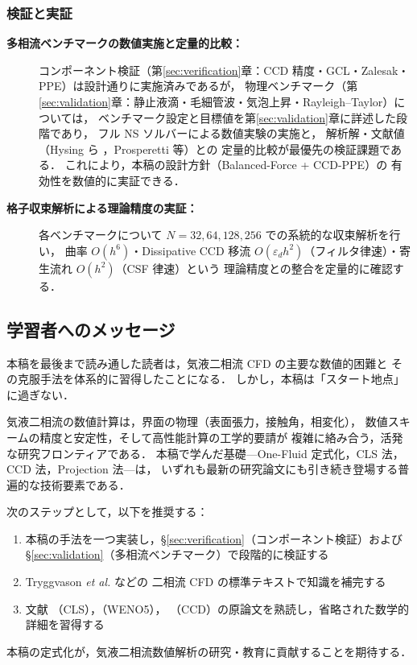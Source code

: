 \subsubsection{検証と実証}

\begin{description}
  \item[\textbf{多相流ベンチマークの数値実施と定量的比較：}]
        コンポーネント検証（第\ref{sec:verification}章：CCD 精度・GCL・Zalesak・PPE）は設計通りに実施済みであるが，
        物理ベンチマーク（第\ref{sec:validation}章：静止液滴・毛細管波・気泡上昇・Rayleigh--Taylor）については，
        ベンチマーク設定と目標値を第\ref{sec:validation}章に詳述した段階であり，
        フル NS ソルバーによる数値実験の実施と，
        解析解・文献値（Hysing ら \cite{Hysing2009}，Prosperetti \cite{Prosperetti1981} 等）との
        定量的比較が最優先の検証課題である．
        これにより，本稿の設計方針（Balanced-Force + CCD-PPE）の
        有効性を数値的に実証できる．

  \item[\textbf{格子収束解析による理論精度の実証：}]
        各ベンチマークについて $N = 32, 64, 128, 256$ での系統的な収束解析を行い，
        曲率 $O(h^6)$・Dissipative CCD 移流 $O(\varepsilon_d h^2)$（フィルタ律速）・寄生流れ $O(h^2)$（CSF 律速）という
        理論精度との整合を定量的に確認する．
\end{description}

\subsection{学習者へのメッセージ}
\label{sec:message}

本稿を最後まで読み通した読者は，気液二相流 CFD の主要な数値的困難と
その克服手法を体系的に習得したことになる．
しかし，本稿は「スタート地点」に過ぎない．

気液二相流の数値計算は，界面の物理（表面張力，接触角，相変化），
数値スキームの精度と安定性，そして高性能計算の工学的要請が
複雑に絡み合う，活発な研究フロンティアである．
本稿で学んだ基礎—One-Fluid 定式化，CLS 法，CCD 法，Projection 法—は，
いずれも最新の研究論文にも引き続き登場する普遍的な技術要素である．

次のステップとして，以下を推奨する：
\begin{enumerate}
  \item 本稿の手法を一つ実装し，§\ref{sec:verification}（コンポーネント検証）および §\ref{sec:validation}（多相流ベンチマーク）で段階的に検証する
  \item Tryggvason \textit{et al.} \cite{Tryggvason2011} などの
        二相流 CFD の標準テキストで知識を補完する
  \item 文献 \cite{OlssonKreiss2005}（CLS），\cite{JiangShu1996}（WENO5），
        \cite{ChuFan1998}（CCD）の原論文を熟読し，省略された数学的詳細を習得する
\end{enumerate}

本稿の定式化が，気液二相流数値解析の研究・教育に貢献することを期待する．
